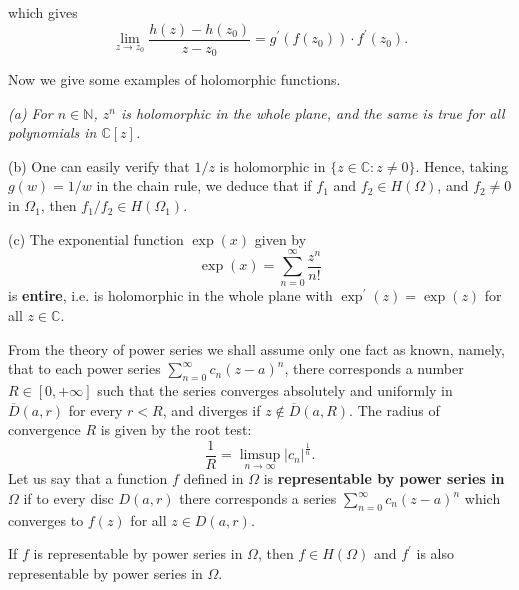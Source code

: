 which gives 
$$
\lim_{z\rightarrow z_0} \frac{h\left( z \right) -h\left( z_0 \right)}{z-z_0}=g^{\prime}\left( f\left( z_0 \right) \right) \cdot f^{\prime}\left( z_0 \right) .
$$\par
Now we give some examples of holomorphic functions.
\begin{example}\em
(a) For $n\in\mathbb{N}$, $z^n$ is holomorphic in the whole plane, and the same is true for all polynomials in $\mathbb{C}[z]$.\par
(b) One can easily verify that $1/z$ is holomorphic in $\{z\in\mathbb{C}:z\ne 0\}$. Hence, taking $g(w)=1/w$ in the chain rule, we deduce that if $f_1$ and $f_2\in H(\Omega)$, and $f_2\ne 0$ in $\Omega_1$, then $f_1/f_2\in H(\Omega_1)$.\par
(c) The exponential function $\exp(x)$ given by 
$$\exp(x)=\sum_{n=0}^\infty\frac{z^n}{n!}$$
is \textbf{entire}, i.e. is holomorphic in the whole plane with $\exp^\prime(z)=\exp(z)$ for all $z\in\mathbb{C}$.
\end{example}
From the theory of power series we shall assume only one fact as known, namely, that to each power series $\sum_{n=0}^\infty c_n(z-a)^n$, there corresponds a number $R\in[0,+\infty]$ such that the series converges absolutely and uniformly in $\overline{D}(a,r)$ for every $r<R$, and diverges if $z\notin\overline{D}(a,R)$. The radius of convergence $R$ is given by the root test: 
$$
\frac{1}{R}=\mathop {\lim\mathrm{sup}} \limits_{n\rightarrow \infty}\left| c_n \right|^{\frac{1}{n}}.
$$
Let us say that a function $f$ defined in $\Omega$ is \textbf{representable by power series in $\Omega$} if to every disc $D(a,r)$ there corresponds a series $\sum_{n=0}^\infty c_n(z-a)^n$ which converges to $f(z)$ for all $z\in D(a,r)$.
\begin{theorem}
If $f$ is representable by power series in $\Omega$, then $f\in H(\Omega)$ and $f^\prime$ is also representable by power series in $\Omega$.
\end{theorem}
